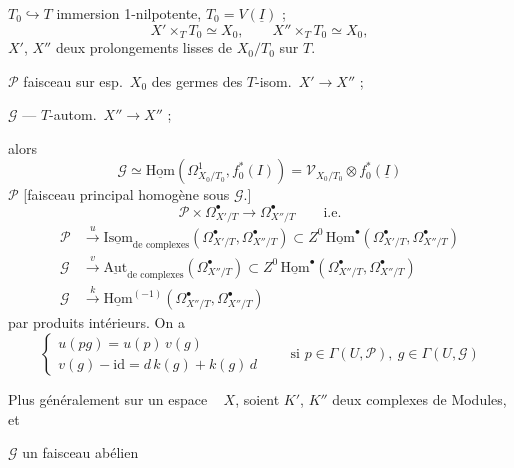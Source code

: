 \documentclass[11pt,a4paper]{article}
\begin{document}
$T_0 \hookrightarrow T$ immersion 1-nilpotente, $T_0 = V(\underline{I})$ ;
\[
  X' \times_T T_0 \simeq X_0 , \qquad X'' \times_T T_0 \simeq X_0 ,
\]
$X'$, $X''$ deux prolongements lisses de $X_0/T_0$ sur $T$.

$\mathscr{P}$ faisceau sur esp.\ $X_0$ des germes des $T$-isom.\
$X' \to X''$ ;

$\mathscr{G}$ — $T$-autom.\ $X'' \to X''$ ;

alors
\[
  \mathscr{G} \simeq \underline{\mathrm{Hom}}(\Omega^1_{X_0/T_0}, f_0^*(I))
  = \mathscr{V}_{X_0/T_0} \otimes f_0^*(\underline{I})
\]
$\mathscr{P}$  
[faisceau principal homogène  sous $\mathscr{G}$.]
\[
  \mathscr{P} \times \Omega^\bullet_{X'/T} \to \Omega^\bullet_{X''/T}
  \qquad \text{i.e.}
\]
\begin{align*}
  \mathscr{P} &\xrightarrow{u} \underline{\mathrm{Isom}}_{\text{de complexes}}
    (\Omega^\bullet_{X'/T}, \Omega^\bullet_{X''/T})
    \subset Z^0\, \underline{\mathrm{Hom}}^\bullet
    (\Omega^\bullet_{X'/T}, \Omega^\bullet_{X''/T}) \\
  \mathscr{G} &\xrightarrow{v} \underline{\mathrm{Aut}}_{\text{de complexes}}
    (\Omega^\bullet_{X''/T})
    \subset Z^0\, \underline{\mathrm{Hom}}^\bullet
    (\Omega^\bullet_{X''/T}, \Omega^\bullet_{X''/T}) \\
  \mathscr{G} &\xrightarrow{k} \underline{\mathrm{Hom}}^{(-1)}
    (\Omega^\bullet_{X''/T}, \Omega^\bullet_{X''/T})
\end{align*}
par produits intérieurs. On a
\[
  \begin{cases}
    u(pg) = u(p)\, v(g) \\
    v(g) - \mathrm{id} = d\, k(g) + k(g)\, d
  \end{cases}
  \qquad \text{si } p \in \Gamma(U, \mathscr{P}),\ g \in \Gamma(U, \mathscr{G})
\]

Plus généralement sur un espace \  $X$, soient $K'$, $K''$ deux
complexes de Modules, et

$\mathscr{G}$ un faisceau abélien
\end{document}
